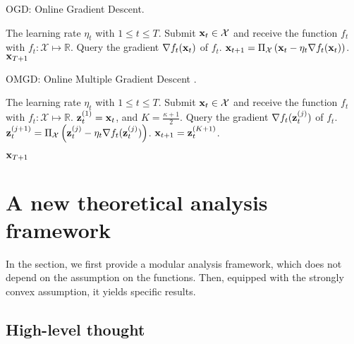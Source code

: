 \documentclass{article}
\begin{document}
\begin{algorithm}[!t]
   \caption{OGD: Online Gradient Descent.}
   \label{algo_ogd}
   \begin{algorithmic}[1]
   \Require The learning rate $\eta_t$ with $1\le t\le T$.
           \State Submit ${\bf x}_t\in{\mathcal{X}}$ and receive the function $f_t$ with $f_t: \mathcal{X}\mapsto \mathbb{R}$.
            \State Query the gradient $\nabla f_t({\bf x}_t)$ of $f_t$.  
           \State ${\bf x}_{t+1} = \Pi_{{\mathcal{X}}}\left(  {\bf x}_t - \eta_t \nabla f_t({\bf x}_t)  \right)$. 
       \EndFor
       \Return ${\bf x}_{T+1}$
   \end{algorithmic}
\end{algorithm}


\begin{algorithm}[!t]
   \caption{OMGD: Online Multiple Gradient Descent \cite{Zhang:2016wl}. }
   \label{algo_omgd}
   \begin{algorithmic}[1]
   \Require The learning rate $\eta_t$ with $1\le t\le T$.
           \State Submit ${\bf x}_t\in{\mathcal{X}}$ and receive the function $f_t$ with $f_t: \mathcal{X}\mapsto \mathbb{R}$.
           \State ${\bf z}_t^{(1)} = {\bf x}_t$, and $K = \frac{\kappa + 1}{2}$.
            \State Query the gradient $\nabla f_t({\bf z}_t^{(j)})$ of $f_t$.  
           \State ${\bf z}_t^{(j+1)} = \Pi_{{\mathcal{X}}}\left(  {\bf z}_t^{(j)} - \eta_t \nabla f_t({\bf z}_t^{(j)})  \right)$. 
           \EndFor
           \State ${\bf x}_{t+1} = {\bf z}_t^{(K+1)}$.
       \EndFor
       
       \Return ${\bf x}_{T+1}$
   \end{algorithmic}
\end{algorithm}





\section{A new theoretical analysis framework}
\label{sect_theoretical_analysis}

In the section, we first provide a modular analysis framework, which does not depend on the assumption on the functions. Then, equipped with the strongly convex assumption, it yields specific results. 

\subsection{High-level thought}
\end{document}
